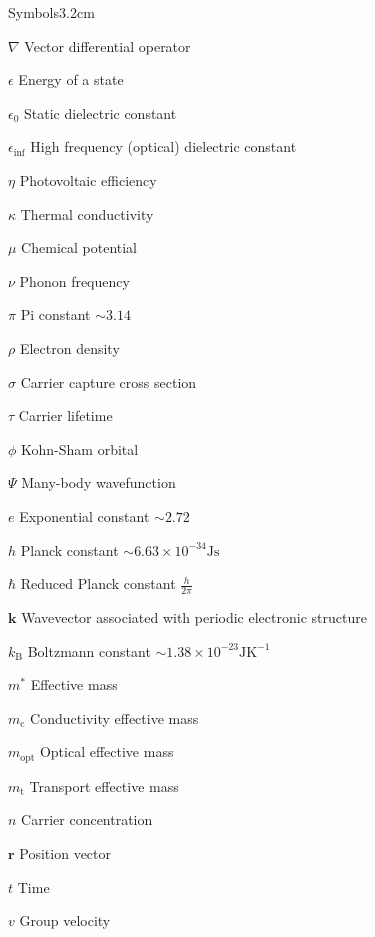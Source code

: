 \begin{mclistof}{Symbols}{3.2cm}

\item[$\nabla$] Vector differential operator
\item[$\epsilon$] Energy of a state
\item[$\epsilon_0$] Static dielectric constant
\item[$\epsilon_{\inf}$] High frequency (optical) dielectric constant 
\item[$\eta$] Photovoltaic efficiency
\item[$\kappa$] Thermal conductivity
\item[$\mu$] Chemical potential
\item[$\nu$] Phonon frequency
\item[$\pi$] Pi constant $\sim 3.14$
\item[$\rho$] Electron density
\item[$\sigma$] Carrier capture cross section
\item[$\tau$] Carrier lifetime
\item[$\phi$] Kohn-Sham orbital

\vspace{\frontmatterbaselineskip}

\item[$\Psi$] Many-body wavefunction

\vspace{\frontmatterbaselineskip}

\item[$e$] Exponential constant $\sim 2.72$
\item[$h$] Planck constant $\sim 6.63\times10^{-34}\textrm{Js}$
\item[$\hbar$] Reduced Planck constant $\frac{h}{2\pi}$ 
\item[$\textbf{k}$] Wavevector associated with periodic electronic structure
\item[$k_\mathrm{B}$] Boltzmann constant $\sim 1.38\times10^{-23}\textrm{JK}^{-1}$
\item[$m^*$] Effective mass
\item[$m_\mathrm{c}$] Conductivity effective mass
\item[$m_\mathrm{opt}$] Optical effective mass
\item[$m_\mathrm{t}$] Transport effective mass
\item[$n$] Carrier concentration
\item[$\textbf{r}$] Position vector
\item[$t$] Time
\item[$v$] Group velocity


\end{mclistof}
